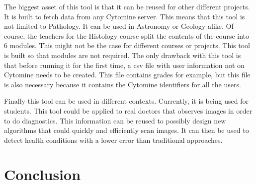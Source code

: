 \documentclass[a4paper,11pt]{report}
\numberwithin{figure}{chapter} %
\begin{document}
        The biggest asset of this tool is that it can be reused for other different projects.
        It is built to fetch data from any Cytomine server.
        This means that this tool is not limited to Pathology.
        It can be used in Astronomy or Geology alike.
        Of course, the teachers for the Histology course split the contents of the course into 6 modules.
        This might not be the case for different courses or projects.
        This tool is built so that modules are not required.
        The only drawback with this tool is that before running it for the first time, a csv file with user information not on Cytomine needs to be created.
        This file contains grades for example, but this file is also necessary because it contains the Cytomine identifiers for all the users.


        Finally this tool can be used in different contexts.
        Currently, it is being used for students.
        This tool could be applied to real doctors that observes images in order to do diagnostics.
        This information can be reused to possibly design new algorithms that could quickly and efficiently scan images.
        It can then be used to detect health conditions with a lower error than traditional approaches.



\chapter{Conclusion}
\end{document}

